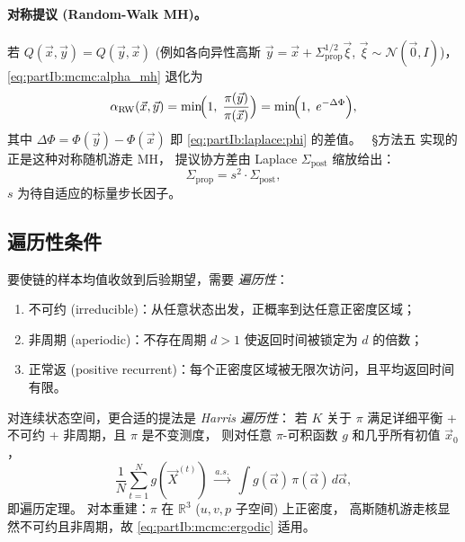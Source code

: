 \paragraph{对称提议 (Random-Walk MH)。}
若 $Q(\vec x,\vec y)=Q(\vec y,\vec x)$ (例如各向异性高斯
$\vec y=\vec x+\Sigma_{\mathrm{prop}}^{1/2}\vec\xi$, $\vec\xi\sim\mathcal N(\vec 0,I)$)，
\eqref{eq:partIb:mcmc:alpha_mh} 退化为
\begin{equation}
  \alpha_{\mathrm{RW}}(\vec x,\vec y)
  = \min\!\Bigl(1,\;\frac{\pi(\vec y)}{\pi(\vec x)}\Bigr)
  = \min\!\Bigl(1,\;e^{-\Delta\Phi}\Bigr),
  \label{eq:partIb:mcmc:alpha_rw}
\end{equation}
其中 $\Delta\Phi=\Phi(\vec y)-\Phi(\vec x)$
即 \eqref{eq:partIb:laplace:phi} 的差值。
\StatusReport\ §方法五 实现的正是这种对称随机游走 MH，
提议协方差由 Laplace $\Sigma_{\mathrm{post}}$ 缩放给出：
\begin{equation}
  \Sigma_{\mathrm{prop}} = s^2\cdot\Sigma_{\mathrm{post}},
  \label{eq:partIb:mcmc:sprop}
\end{equation}
$s$ 为待自适应的标量步长因子。

\subsection{遍历性条件}
\label{sec:partIb:mcmc:ergodic}

要使链的样本均值收敛到后验期望，需要 \emph{遍历性}：

\begin{enumerate}[label=(E\arabic*)]
  \item 不可约 (irreducible)：从任意状态出发，正概率到达任意正密度区域；
  \item 非周期 (aperiodic)：不存在周期 $d>1$ 使返回时间被锁定为 $d$ 的倍数；
  \item 正常返 (positive recurrent)：每个正密度区域被无限次访问，且平均返回时间有限。
\end{enumerate}

对连续状态空间，更合适的提法是 \emph{Harris 遍历性}：
若 $K$ 关于 $\pi$ 满足详细平衡 + 不可约 + 非周期，且 $\pi$ 是不变测度，
则对任意 $\pi$-可积函数 $g$ 和几乎所有初值 $\vec x_0$，
\begin{equation}
  \frac{1}{N}\sum_{t=1}^{N}g(\vec X^{(t)})
  \;\xrightarrow{a.s.}\;
  \int g(\vec\alpha)\,\pi(\vec\alpha)\,d\vec\alpha,
  \label{eq:partIb:mcmc:ergodic}
\end{equation}
即遍历定理。
对本重建：$\pi$ 在 $\mathbb R^3$ ($u,v,p$ 子空间) 上正密度，
高斯随机游走核显然不可约且非周期，故 \eqref{eq:partIb:mcmc:ergodic} 适用。


